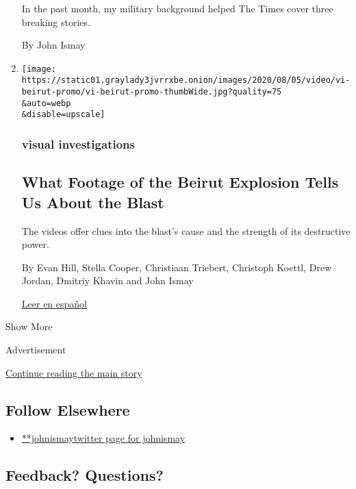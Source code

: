 \begin{enumerate}
  In the past month, my military background helped The Times cover three
  breaking stories.

  By John Ismay
\item
  \href{/2020/08/05/world/middleeast/beirut-explosion-footage.html}{}

  \texttt{[image: https://static01.graylady3jvrrxbe.onion/images/2020/08/05/video/vi-beirut-promo/vi-beirut-promo-thumbWide.jpg?quality=75\\\&auto=webp\\\&disable=upscale]}

  \hypertarget{visual-investigations-1}{%
  \subsubsection{visual investigations}\label{visual-investigations-1}}

  \hypertarget{what-footage-of-the-beirut-explosion-tells-us-about-the-blast}{%
  \subsection{What Footage of the Beirut Explosion Tells Us About the
  Blast}\label{what-footage-of-the-beirut-explosion-tells-us-about-the-blast}}

  The videos offer clues into the blast's cause and the strength of its
  destructive power.

  By Evan Hill, Stella Cooper, Christiaan Triebert, Christoph Koettl,
  Drew Jordan, Dmitriy Khavin and John Ismay

  \href{https://www.nytimes3xbfgragh.onion/es/2020/08/06/espanol/mundo/beirut-video-explosion-libano.html}{Leer
  en español}
\end{enumerate}

Show More

Advertisement

\protect\hyperlink{after-mid2}{Continue reading the main story}

\hypertarget{follow-elsewhere}{%
\subsection{Follow Elsewhere}\label{follow-elsewhere}}

\begin{itemize}
\tightlist
\item
  \href{https://twitter.com/johnismay}{**johnismaytwitter page for
  johnismay}
\end{itemize}

\hypertarget{feedback-questions}{%
\subsection{Feedback? Questions?}\label{feedback-questions}}

